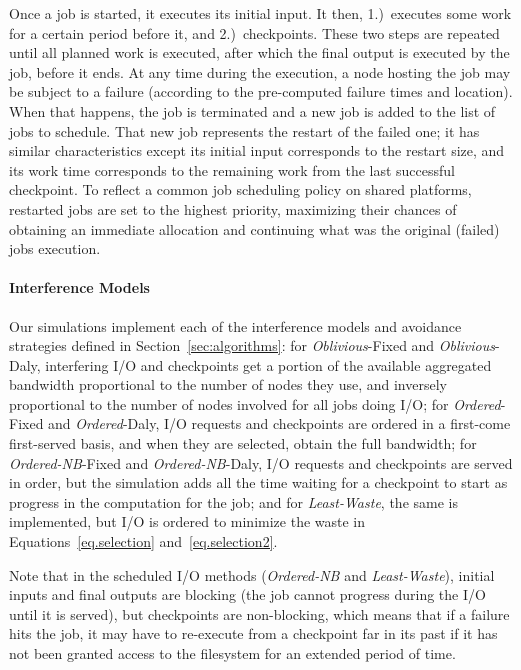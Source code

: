 \documentclass[conference,nofonttune]{IEEEtran}
\newcommand{\nocoop}{\emph{Oblivious}\xspace}
\newcommand{\fifoblock}{\emph{Ordered}\xspace}
\newcommand{\fifononblock}{\emph{Ordered-NB}\xspace}
\newcommand{\leastwaste}{\emph{Least-Waste}\xspace}
\def\propfixed{\nocoop-Fixed\xspace}
\def\propdaly{\nocoop-Daly\xspace}
\def\bfifofixed{\fifoblock-Fixed\xspace}
\def\bfifodaly{\fifoblock-Daly\xspace}
\def\fifofixed{\fifononblock-Fixed\xspace}
\def\fifodaly{\fifononblock-Daly\xspace}
\def\cooperative{\leastwaste}
\begin{document}
Once a job is started, it executes its initial input. It then, 1.)~executes
some work for a certain period before it, and 2.)~checkpoints. These two steps
are repeated until all planned work is executed, after which the final output
is executed by the job, before it ends.  At any time during the execution, a
node hosting the job may be subject to a failure (according to the pre-computed
failure times and location). When that happens, the job is terminated and a new
job is added to the list of jobs to schedule. That new job represents the
restart of the failed one; it has similar characteristics except its initial
input corresponds to the restart size, and its work time corresponds to the
remaining work from the last successful checkpoint. To reflect a common job
scheduling policy on shared platforms, restarted jobs are set to the highest
priority, maximizing their chances of obtaining an immediate allocation and
continuing what was the original (failed) jobs execution.


\paragraph*{Interference Models} Our simulations implement each of the
interference models and avoidance strategies defined in
Section~\ref{sec:algorithms}: for \propfixed and \propdaly,
interfering I/O and checkpoints get a portion of the available
aggregated bandwidth proportional to the number of nodes they use, and
inversely proportional to the number of nodes involved for all
jobs doing I/O; for \bfifofixed and \bfifodaly, I/O requests
and checkpoints are ordered in a first-come first-served basis, and
when they are selected, obtain the full bandwidth; for \fifofixed and
\fifodaly, I/O requests and checkpoints are served in order, but the
simulation adds all the time waiting for a checkpoint to start as
progress in the computation for the job; and for \cooperative,
the same is implemented, but I/O is ordered to minimize the waste in
Equations~\eqref{eq.selection} and~\eqref{eq.selection2}.

Note that in the scheduled I/O methods (\fifononblock and \cooperative),
initial inputs and final outputs are blocking (the job cannot progress during
the I/O until it is served), but checkpoints are non-blocking, which means that
if a failure hits the job, it may have to re-execute from a checkpoint far in
its past if it has  not been granted access to the filesystem for an extended
period of time.
\end{document}
